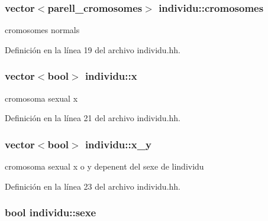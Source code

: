 \subsubsection[{\texorpdfstring{cromosomes}{cromosomes}}]{\setlength{\rightskip}{0pt plus 5cm}vector$<${\bf parell\+\_\+cromosomes}$>$ individu\+::cromosomes\hspace{0.3cm}{\ttfamily [private]}}\hypertarget{classindividu_ae5e0a83ff9e943cbcdf95b74069ad3a7}{}\label{classindividu_ae5e0a83ff9e943cbcdf95b74069ad3a7}


cromosomes normals 



Definición en la línea 19 del archivo individu.\+hh.

\subsubsection[{\texorpdfstring{x}{x}}]{\setlength{\rightskip}{0pt plus 5cm}vector$<$bool$>$ individu\+::x\hspace{0.3cm}{\ttfamily [private]}}\hypertarget{classindividu_a3c4abda8daead156b5519f69bd224fa9}{}\label{classindividu_a3c4abda8daead156b5519f69bd224fa9}


cromosoma sexual x 



Definición en la línea 21 del archivo individu.\+hh.

\subsubsection[{\texorpdfstring{x\+\_\+y}{x_y}}]{\setlength{\rightskip}{0pt plus 5cm}vector$<$bool$>$ individu\+::x\+\_\+y\hspace{0.3cm}{\ttfamily [private]}}\hypertarget{classindividu_a51eb7827fdd5bd5302e3c962fd719fc0}{}\label{classindividu_a51eb7827fdd5bd5302e3c962fd719fc0}


cromosoma sexual x o y depenent del sexe de l\textquotesingle{}individu 



Definición en la línea 23 del archivo individu.\+hh.

\subsubsection[{\texorpdfstring{sexe}{sexe}}]{\setlength{\rightskip}{0pt plus 5cm}bool individu\+::sexe\hspace{0.3cm}{\ttfamily [private]}}\hypertarget{classindividu_ab62faa6985cc0520c33a206fc5a89e37}{}\label{classindividu_ab62faa6985cc0520c33a206fc5a89e37}


